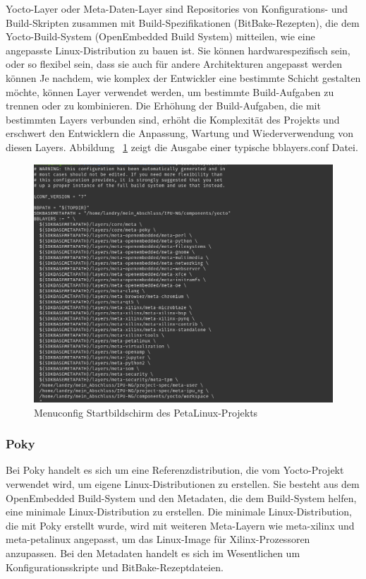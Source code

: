 Yocto-Layer oder Meta-Daten-Layer sind Repositories von Konfigurations- und Build-Skripten zusammen mit Build-Spezifikationen (BitBake-Rezepten), die dem Yocto-Build-System (OpenEmbedded Build System) mitteilen, wie eine angepasste Linux-Distribution zu bauen ist. Sie können hardwarespezifisch sein, oder so flexibel sein, dass sie auch für andere Architekturen angepasst werden können
Je nachdem, wie komplex der Entwickler eine bestimmte Schicht gestalten möchte, können Layer verwendet werden, um bestimmte Build-Aufgaben zu trennen oder zu kombinieren. Die Erhöhung der Build-Aufgaben, die mit  bestimmten Layers verbunden sind, erhöht die Komplexität des Projekts und erschwert den Entwicklern die Anpassung, Wartung und Wiederverwendung von diesen Layers. Abbildung ~\ref{fig:bblayers} zeigt die Ausgabe einer typische bblayers.conf Datei.

\begin{figure}[H]
	\begin{center}		\includegraphics[width=1\textwidth]{./images/bblayer_datei.jpg}
	\end{center}
	\vspace{-5pt}
	\caption[Menuconfig Startbildschirm des PetaLinux-Projekts]{Menuconfig Startbildschirm des PetaLinux-Projekts} %
	\label{fig:bblayers}
	\vspace{-5pt}
\end{figure}



\subsubsection{Poky}
Bei Poky handelt es sich um eine Referenzdistribution, die vom Yocto-Projekt verwendet wird, um eigene Linux-Distributionen zu erstellen. Sie besteht aus dem OpenEmbedded Build-System und den Metadaten, die dem Build-System helfen, eine minimale Linux-Distribution zu erstellen. Die minimale Linux-Distribution, die mit Poky erstellt wurde, wird mit weiteren Meta-Layern wie meta-xilinx und meta-petalinux angepasst, um das Linux-Image für Xilinx-Prozessoren anzupassen. Bei den Metadaten handelt es sich im Wesentlichen um Konfigurationsskripte und BitBake-Rezeptdateien.

